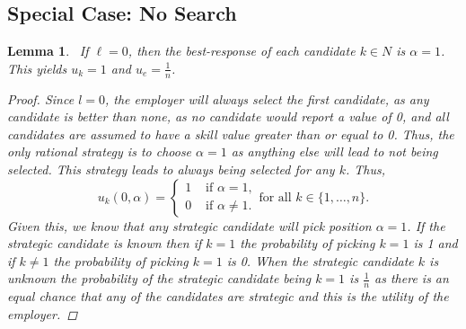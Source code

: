 \documentclass{article}
\newtheorem{lemma}{Lemma}
\begin{document}

\subsection{Special Case: No Search}

\begin{lemma}\ \label{l=0}
If $\ell=0$, then the best-response of each candidate $k\in N$ is $\alpha=1$. This yields $u_k = 1$ and $u_e=\frac{1}{n}$. \label{lemma:applicant_employer:l=0}
\begin{proof}
Since $l=0$, the employer will always select the first candidate, as any candidate is better than none, as no candidate would report a value of 0, and all candidates are assumed to have a skill value greater than or equal to 0. Thus, the only rational strategy is to choose $\alpha = 1$ as anything else will lead to not being selected. This strategy leads to always being selected for any $k$. Thus, 
$$ u_k(0,\alpha) =
\begin{cases}
    1 & \text{ if } \alpha = 1, \\
    0 & \text{ if } \alpha \neq 1.
\end{cases}
\text{for all } k \in \{1, \ldots, n \}. $$
Given this, we know that any strategic candidate will pick position $\alpha = 1$. If the strategic candidate is known then if $k = 1$ the probability of picking $k=1$ is 1 and if $k\neq1$ the probability of picking $k=1$ is 0. When the strategic candidate $k$ is unknown the probability of the strategic candidate being $k=1$ is $\frac{1}{n}$ as there is an equal chance that any of the candidates are strategic and this is the utility of the employer.
\end{proof}
\end{lemma}
\end{document}
